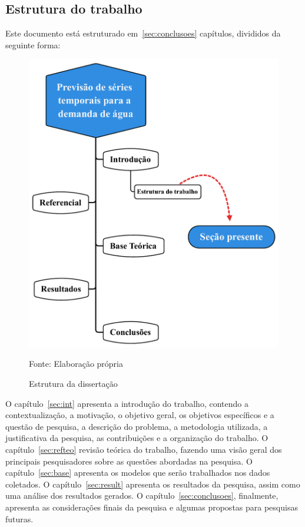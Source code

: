 \subsection{Estrutura do trabalho} \label{subsec:estrutura}

 Este documento está estruturado em~\ref{sec:conclusoes} capítulos, divididos da seguinte forma:
   
    \begin{figure}[H]
    	\centering
    	\caption{Estrutura da dissertação}
    	\label{fig:estrutura}
    	\includegraphics[width=0.7\linewidth]{Introducao/Figuras/Estrutura}
    	
    	Fonte: Elaboração própria 
    \end{figure}
O capítulo~\ref{sec:int} apresenta a introdução do trabalho, contendo a contextualização, a motivação, o objetivo geral, os objetivos específicos e a questão de pesquisa, a descrição do problema, a metodologia utilizada, a justificativa da pesquisa, as contribuições e a organização do trabalho.
O capítulo~\ref{sec:refteo} revisão teórica do trabalho, fazendo uma visão geral dos principais pesquisadores sobre as questões abordadas na pesquisa.
O capítulo~\ref{sec:base} apresenta os modelos que serão trabalhados nos dados coletados.
O capítulo~\ref{sec:result} apresenta os resultados da pesquisa, assim como uma análise dos resultados gerados.
O capítulo~\ref{sec:conclusoes}, finalmente, apresenta as considerações finais da pesquisa e algumas propostas para pesquisas futuras.


